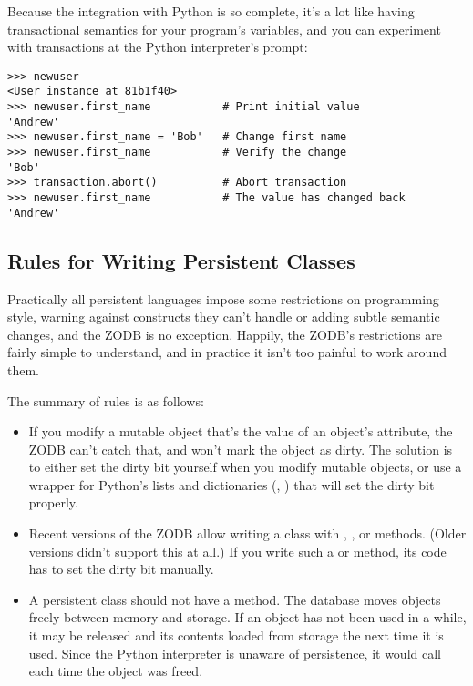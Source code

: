Because the integration with Python is so complete, it's a lot like
having transactional semantics for your program's variables, and you
can experiment with transactions at the Python interpreter's prompt:

\begin{verbatim}>>> newuser
<User instance at 81b1f40>
>>> newuser.first_name           # Print initial value
'Andrew'         
>>> newuser.first_name = 'Bob'   # Change first name
>>> newuser.first_name           # Verify the change
'Bob'
>>> transaction.abort()          # Abort transaction
>>> newuser.first_name           # The value has changed back
'Andrew'
\end{verbatim}

\subsection{Rules for Writing Persistent Classes}

Practically all persistent languages impose some restrictions on
programming style, warning against constructs they can't handle or
adding subtle semantic changes, and the ZODB is no exception.
Happily, the ZODB's restrictions are fairly simple to understand, and
in practice it isn't too painful to work around them.

The summary of rules is as follows:

\begin{itemize}

\item If you modify a mutable object that's the value of an object's
attribute, the ZODB can't catch that, and won't mark the object as
dirty.  The solution is to either set the dirty bit yourself when you
modify mutable objects, or use a wrapper for Python's lists and
dictionaries (,
)
that will set the dirty bit properly.

\item Recent versions of the ZODB allow writing a class with 
 , , or 
methods.  (Older versions didn't support this at all.)  If you write
such a  or  method, its code
has to set the dirty bit manually.

\item A persistent class should not have a  method.
The database moves objects freely between memory and storage.  If an
object has not been used in a while, it may be released and its
contents loaded from storage the next time it is used.  Since the
Python interpreter is unaware of persistence, it would call
 each time the object was freed.

\end{itemize}

